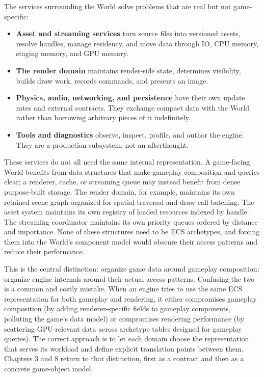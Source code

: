 \documentclass[
  11pt,
  letterpaper,
  DIV=11,
  numbers=noendperiod,
  twoside,
  open=right]{scrreprt}
\providecommand{\tightlist}{%
  \setlength{\itemsep}{0pt}\setlength{\parskip}{0pt}}
\begin{document}
The services surrounding the World solve problems that are real but not
game-specific:

\begin{itemize}
\tightlist
\item
  \textbf{Asset and streaming services} turn source files into versioned
  assets, resolve handles, manage residency, and move data through IO,
  CPU memory, staging memory, and GPU memory.
\item
  \textbf{The render domain} maintains render-side state, determines
  visibility, builds draw work, records commands, and presents an image.
\item
  \textbf{Physics, audio, networking, and persistence} have their own
  update rates and external contracts. They exchange compact data with
  the World rather than borrowing arbitrary pieces of it indefinitely.
\item
  \textbf{Tools and diagnostics} observe, inspect, profile, and author
  the engine. They are a production subsystem, not an afterthought.
\end{itemize}

These services do not all need the same internal representation. A
game-facing World benefits from data structures that make gameplay
composition and queries clear; a renderer, cache, or streaming queue may
instead benefit from dense purpose-built storage. The render domain, for
example, maintains its own retained scene graph organized for spatial
traversal and draw-call batching. The asset system maintains its own
registry of loaded resources indexed by handle. The streaming
coordinator maintains its own priority queues ordered by distance and
importance. None of these structures need to be ECS archetypes, and
forcing them into the World's component model would obscure their access
patterns and reduce their performance.

This is the central distinction: organize game data around gameplay
composition; organize engine internals around their actual access
patterns. Confusing the two is a common and costly mistake. When an
engine tries to use the same ECS representation for both gameplay and
rendering, it either compromises gameplay composition (by adding
renderer-specific fields to gameplay components, polluting the game's
data model) or compromises rendering performance (by scattering
GPU-relevant data across archetype tables designed for gameplay
queries). The correct approach is to let each domain choose the
representation that serves its workload and define explicit translation
points between them. Chapters 3 and 8 return to that distinction, first
as a contract and then as a concrete game-object model.
\end{document}

